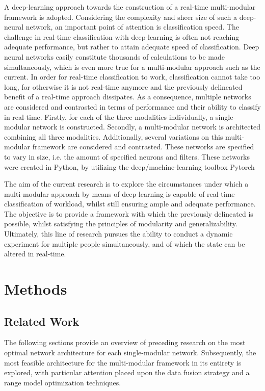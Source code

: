 \documentclass[12pt]{article}
\begin{document}
A deep-learning approach towards the construction of a real-time multi-modular framework is adopted. Considering the complexity and sheer size of such a deep-neural network, an important point of attention is classification speed. The challenge in real-time classification with deep-learning is often not reaching adequate performance, but rather to attain adequate speed of classification. Deep neural networks easily constitute thousands of calculations to be made simultaneously, which is even more true for a multi-modular approach such as the current. In order for real-time classification to work, classification cannot take too long, for otherwise it is not real-time anymore and the previously delineated benefit of a real-time approach dissipates. As a consequence, multiple networks are considered and contrasted in terms of performance and their ability to classify in real-time. Firstly, for each of the three modalities individually, a single-modular network is constructed. Secondly, a multi-modular network is architected combining all three modalities. Additionally, several variations on this multi-modular framework are considered and contrasted. These networks are specified to vary in size, i.e. the amount of specified neurons and filters. These networks were created in Python, by utilizing the deep/machine-learning toolbox Pytorch \cite{paszke2017automatic}

The aim of the current research is to explore the circumstances under which a multi-modular approach by means of deep-learning is capable of real-time classification of workload, whilst still ensuring ample and adequate performance. The objective is to provide a framework with which the previously delineated is possible, whilst satisfying the principles of modularity and generalizability. Ultimately, this line of research pursues the ability to conduct a dynamic experiment for multiple people simultaneously, and of which the state can be altered in real-time. 

\newpage
\section{Methods}

\subsection{Related Work} 
The following sections provide an overview of preceding research on the most optimal network architecture for each single-modular network. Subsequently, the most feasible architecture for the multi-modular framework in its entirety is explored, with particular attention placed upon the data fusion strategy and a range model optimization techniques.
\end{document}
